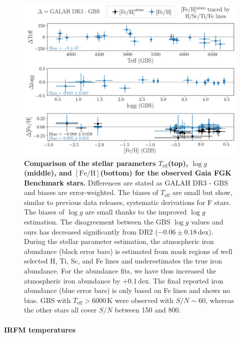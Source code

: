 \documentclass[fleqn,usenatbib,useAMS]{mnras}
\newcommand{\Teff}{$T_\mathrm{eff}$\xspace}
\newcommand{\logg}{$\log g$\xspace}
\newcommand{\feh}{$\mathrm{[Fe/H]}$\xspace}
\begin{document}
\begin{figure}
\centering
\includegraphics[width=\columnwidth]{figures/gbs_performance_lbol.png}
\caption{
\textbf{Comparison of the stellar parameters \Teff (top), \logg (middle), and \feh (bottom) for the observed Gaia FGK Benchmark stars.}
Differences are stated as GALAH DR3 - GBS \citep{Jofre2018a} and biases are error-weighted. The biases of \Teff are small but show, similar to previous data releases, systematic derivations for F stars. The biases of \logg are small thanks to the improved \logg estimation. The disagreement between the GBS $\log g$ values and ours has decreased significantly from DR2 ($-0.06\pm0.18\,\mathrm{dex}$). During the stellar parameter estimation, the atmospheric iron abundance (black error bars) is estimated from mask regions of well selected H, Ti, Sc, and Fe lines and underestimates the true iron abundance. For the abundance fits, we have thus increased the atmospheric iron abundance by $+0.1\,\mathrm{dex}$. The final reported iron abundance (blue error bars) is only based on Fe lines and shows no bias. GBS with $T_\text{eff} > 6000\,\mathrm{K}$ were observed with $S/N \sim 60$, whereas the other stars all cover $S/N$ between 150 and 800.}
\label{fig:gbs_performance}
\end{figure}

\paragraph*{IRFM temperatures}
\end{document}
